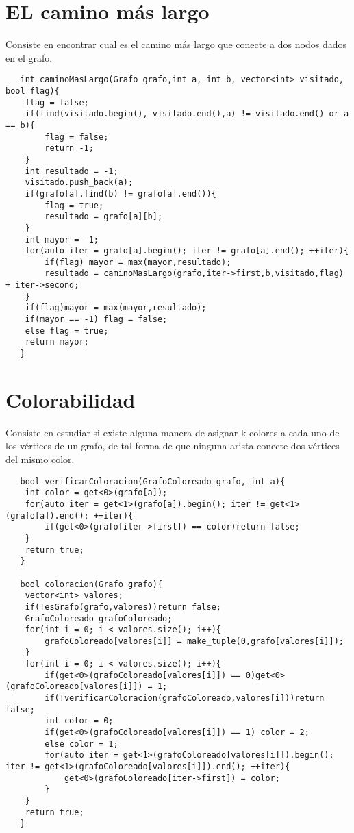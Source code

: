\documentclass[a4paper,12pt]{article}
\begin{document}
  \section{EL camino más largo}
  Consiste en encontrar cual es el camino más largo que conecte a dos nodos
  dados en el grafo.
  \begin{lstlisting}
   int caminoMasLargo(Grafo grafo,int a, int b, vector<int> visitado, bool flag){
    flag = false;
    if(find(visitado.begin(), visitado.end(),a) != visitado.end() or a == b){
        flag = false;
        return -1;
    }
    int resultado = -1;
    visitado.push_back(a);
    if(grafo[a].find(b) != grafo[a].end()){
        flag = true;
        resultado = grafo[a][b];
    }
    int mayor = -1;
    for(auto iter = grafo[a].begin(); iter != grafo[a].end(); ++iter){
        if(flag) mayor = max(mayor,resultado);
        resultado = caminoMasLargo(grafo,iter->first,b,visitado,flag) + iter->second;
    }
    if(flag)mayor = max(mayor,resultado);
    if(mayor == -1) flag = false;
    else flag = true;
    return mayor;
   }
  \end{lstlisting}
  \section{Colorabilidad}
  Consiste en estudiar si existe alguna manera de asignar k colores a cada uno de los
  vértices de un grafo, de tal forma de que ninguna arista conecte dos vértices del mismo color.
  \begin{lstlisting}
   bool verificarColoracion(GrafoColoreado grafo, int a){
    int color = get<0>(grafo[a]);
    for(auto iter = get<1>(grafo[a]).begin(); iter != get<1>(grafo[a]).end(); ++iter){
        if(get<0>(grafo[iter->first]) == color)return false;
    }
    return true;
   }

   bool coloracion(Grafo grafo){
    vector<int> valores;
    if(!esGrafo(grafo,valores))return false;
    GrafoColoreado grafoColoreado;
    for(int i = 0; i < valores.size(); i++){
        grafoColoreado[valores[i]] = make_tuple(0,grafo[valores[i]]);
    }
    for(int i = 0; i < valores.size(); i++){
        if(get<0>(grafoColoreado[valores[i]]) == 0)get<0>(grafoColoreado[valores[i]]) = 1;
        if(!verificarColoracion(grafoColoreado,valores[i]))return false;
        int color = 0;
        if(get<0>(grafoColoreado[valores[i]]) == 1) color = 2;
        else color = 1;
        for(auto iter = get<1>(grafoColoreado[valores[i]]).begin(); iter != get<1>(grafoColoreado[valores[i]]).end(); ++iter){
            get<0>(grafoColoreado[iter->first]) = color;
        }
    }
    return true;
   }
  \end{lstlisting}



  


  
  
\end{document}
